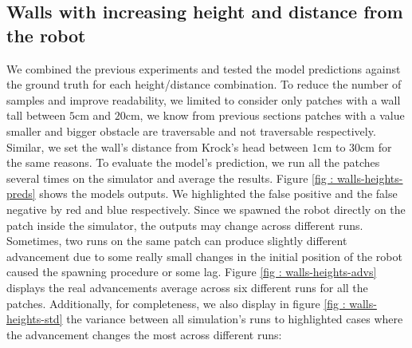\documentclass[../document.tex]{subfiles}
\begin{document}
\subsection{Walls with increasing height and distance from the robot}
We combined the previous experiments and tested the model predictions against the ground truth for each height/distance combination. To reduce the number of samples and improve readability, we limited to consider only patches with a wall tall between $5$cm and $20$cm, we know from previous sections patches with a value smaller and bigger obstacle are traversable and not traversable respectively. Similar, we set the wall's distance from Krock's head between $1$cm to $30$cm for the same reasons. To evaluate the model's prediction, we run all the patches several times on the simulator and average the results. Figure \ref{fig :  walls-heights-preds} shows the models outputs. We highlighted the false positive and the false negative by red and blue respectively.  Since we spawned the robot directly on the patch inside the simulator, the outputs may change across different runs. Sometimes, two runs on the same patch can produce slightly different advancement due to some really small changes in the initial position of the robot caused the spawning procedure or some lag. Figure \ref{fig : walls-heights-advs} displays the real advancements average across six different runs for all the patches. Additionally, for completeness, we also display in figure \ref{fig : walls-heights-std} the variance between all simulation's runs to highlighted cases where the advancement changes the most across different runs:  
\end{document}
